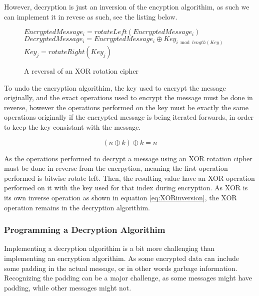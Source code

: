 \documentclass[12pt]{article}
\begin{document}
    However, decryption is just an inversion of the encyption algorithim,
    as such we can implement it in revese as such, see the listing below.

    \begin{figure}[h]
    \begin{algorithmic}[1]
      \State $EncryptedMessage_i = rotateLeft(EncryptedMessage_i)$
      \State $DecryptedMessage_i = EncryptedMessage_i \oplus 
                                   Key_{i \bmod length(Key)}$
          \State $Key_j = rotateRight(Key_j)$
        \EndFor
      \EndIf
    \EndFor
    \end{algorithmic}
    \caption{A reversal of an XOR rotation cipher}
    \end{figure}

    To undo the encryption algorithim, the key used to encrypt the message
    originally, and the exact operations used to encrypt the message must
    be done in reverse, however the operations performed on the key must
    be exactly the same operations originally if the encrypted message
    is being iterated forwards, in order to keep the key consistant 
    with the message.
    
    \begin{equation}
      \label{eq:XORinversion}
      (n \oplus k) \oplus k = n
    \end{equation}

    As the operations performed to decrypt a message using an XOR rotation
    cipher must be done in reverse from the encrpytion, meaning the first
    operation performed is bitwise rotate left. Then, the resulting value
    have an XOR operation performed on it with the key used for that index
    during encryption. As XOR is its own inverse operation as shown in
    equation \eqref{eq:XORinversion}, the XOR operation remains in the
    decryption algorithim.

    \subsubsection{Programming a Decryption Algorithim}
    Implementing a decryption algorithim is a bit more challenging than
    implementing an encryption algorithim. As some encrypted data can
    include some padding in the actual message, or in other words 
    garbage information. Recognizing the padding can be a major
    challenge, as some messages might have padding, while other 
    messages might not.
\end{document}
